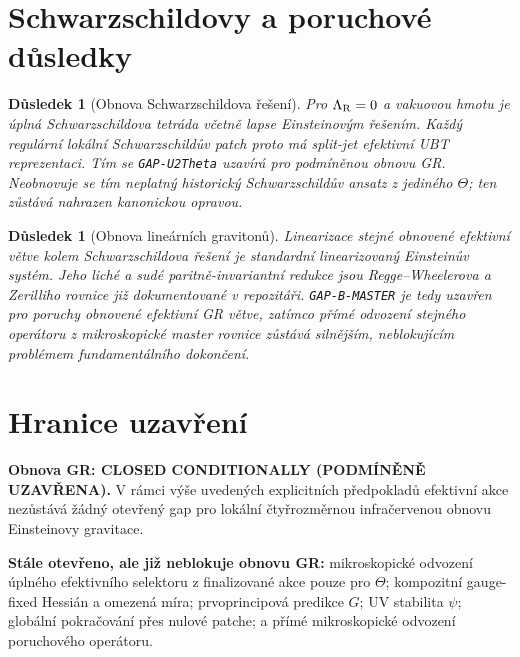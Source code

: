 \documentclass[11pt,a4paper]{article}
\newtheorem{corollary}[theorem]{Důsledek}
\begin{document}
\section{Schwarzschildovy a poruchové důsledky}
\begin{corollary}[Obnova Schwarzschildova řešení]
Pro $\Lambda_{\rm R}=0$ a vakuovou hmotu je úplná Schwarzschildova tetráda
včetně lapse Einsteinovým řešením.  Každý regulární lokální Schwarzschildův
patch proto má split-jet efektivní UBT reprezentaci.  Tím se
\texttt{GAP-U2Theta} uzavírá \emph{pro podmíněnou obnovu GR}.  Neobnovuje se tím
neplatný historický Schwarzschildův ansatz z jediného $\Theta$; ten zůstává
nahrazen kanonickou opravou.
\end{corollary}

\begin{corollary}[Obnova lineárních gravitonů]
Linearizace stejné obnovené efektivní větve kolem Schwarzschildova řešení je
standardní linearizovaný Einsteinův systém.  Jeho liché a sudé
paritně-invariantní redukce jsou Regge--Wheelerova a Zerilliho rovnice již
dokumentované v repozitáři.  \texttt{GAP-B-MASTER} je tedy uzavřen pro poruchy
obnovené efektivní GR větve, zatímco přímé odvození stejného operátoru z
mikroskopické master rovnice zůstává silnějším, neblokujícím problémem
fundamentálního dokončení.
\end{corollary}

\section{Hranice uzavření}
\begin{tcolorbox}[colback=green!6!white,colframe=green!55!black,title=Přesný závěr]
\textbf{Obnova GR: CLOSED CONDITIONALLY (PODMÍNĚNĚ UZAVŘENA).}  V rámci výše
uvedených explicitních předpokladů efektivní akce nezůstává žádný otevřený gap
pro lokální čtyřrozměrnou infračervenou obnovu Einsteinovy gravitace.

\medskip
\textbf{Stále otevřeno, ale již neblokuje obnovu GR:} mikroskopické odvození
úplného efektivního selektoru z finalizované akce pouze pro $\Theta$; kompozitní
gauge-fixed Hessián a omezená míra; prvoprincipová predikce $G$; UV stabilita
$\psi$; globální pokračování přes nulové patche; a přímé mikroskopické odvození
poruchového operátoru.
\end{tcolorbox}
\end{document}
